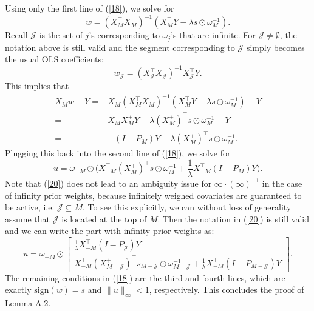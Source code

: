 \documentclass[11pt]{article}
\newcommand{\sgn}{\textrm{sign}}
\begin{document}
	Using only the first line of (\ref{18}), we solve for
	\begin{equation}
		w=(X_M^\top X_M)^{-1}(X_M^\top Y-\lambda s\odot\omega^{-1}_M).
	\end{equation}
	Recall $\mathcal{J}$ is the set of $j$'s corresponding to $\omega_j$'s that are infinite. For $\mathcal{J}\neq \emptyset$, the notation above is still valid and the segment corresponding to ${\mathcal{J}}$ simply becomes the usual OLS coefficients:
	\begin{equation}
		w_{\mathcal{J}}=(X_{\mathcal{J}}^\top X_{\mathcal{J}})^{-1}X_{\mathcal{J}}^\top Y.
	\end{equation}
	This implies that
	\begin{equation}
		\begin{split}
			X_Mw-Y
			=&X_M(X_M^\top X_M)^{-1}(X_M^\top Y-\lambda s\odot\omega^{-1}_M)-Y\\
			=&X_MX_M^+ Y-\lambda (X_M^+)^\top s\odot\omega^{-1}_M-Y\\
			=& -(I-P_M)Y-\lambda (X_M^+)^\top s\odot\omega^{-1}_M.
		\end{split}
	\end{equation}
	Plugging this back into the second line of (\ref{18}), we solve for
	\begin{equation}\label{20}
		u=\omega_{-M}\odot
		\bigg(
		X_{-M}^\top(X_M^+)^\top s\odot\omega^{-1}_M
		+\frac{1}{\lambda }X_{-M}^\top (I-P_M)Y\bigg).
	\end{equation}
	Note that (\ref{20}) does not lead to an ambiguity issue for $\infty\cdot (\infty)^{-1}$ in the case of infinity prior weights, because infinitely weighed covariates are guaranteed to be active, i.e. $\mathcal{J}\subseteq M$. To see this explicitly, we can without loss of generality assume that $\mathcal{J}$ is located at the top of $M$. Then the notation in (\ref{20}) is still valid and we can write the part with infinity prior weights as:
	\begin{equation}
		u=\omega_{-M}\odot
		\begin{bmatrix}
			\frac{1}{\lambda }X_{-M}^\top (I-P_{\mathcal{J}})Y\\
			X_{-M}^\top(X_{M-\mathcal{J}}^+)^\top s_{M-\mathcal{J}}\odot\omega^{-1}_{M-\mathcal{J}}
			+\frac{1}{\lambda }X_{-M}^\top (I-P_{M-\mathcal{J}})Y
		\end{bmatrix}.
	\end{equation}
	The remaining conditions in (\ref{18}) are the third and fourth lines, which are exactly $\sgn(w)=s$ and $\|u\|_\infty<1 $, respectively. This concludes the proof of Lemma A.2.
	
\end{document}
